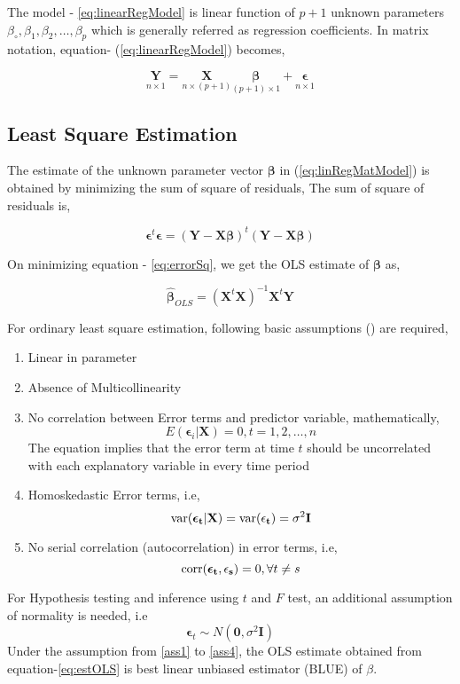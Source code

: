 \documentclass[12pt, lot, lof]{thesis}\usepackage[]{graphicx}\usepackage[]{color}
\newcommand{\bs}[1]{\ensuremath{\boldsymbol{#1}}}
\newcommand{\mbf}[1]{\ensuremath{\mathbf{#1}}}
\newcommand{\vl}[2]{\ensuremath{#1_1, #1_2, \ldots, #1_#2}}
\newcommand{\corr}[1]{\ifmmode \text{corr}(\mathbf{#1})\else corr($\mathbf{#1}$)\fi}
\newcommand{\var}[1]{\ifmmode \text{var}(\mathbf{#1})\else var($\mathbf{#1}$)\fi}
\begin{document}
The model - \ref{eq:linearRegModel} is linear function of $p+1$ unknown parameters $\beta_\circ, \vl{\beta}{p}$ which is generally referred as regression coefficients. In matrix notation, equation- (\ref{eq:linearRegModel}) becomes,

\begin{equation}
  \label{eq:linRegMatModel}
  \underset{n\times 1}{\mbf{Y}}=\underset{n\times(p+1)}{\mbf{X}}\underset{(p+1)\times 1}{\bs{\beta}}+\underset{n\times 1}{\bs{\epsilon}}
\end{equation}

\subsection{Least Square Estimation}
\label{ssec:lstSqEstimation}

The estimate of the unknown parameter vector $\bs{\beta}$ in (\ref{eq:linRegMatModel}) is obtained by minimizing the sum of square of residuals, 
The sum of square of residuals is,

\begin{equation}
  \bs{\epsilon}^{t}\bs{\epsilon}=(\mbf{Y-X}\bs{\beta})^{t}(\mbf{Y-X}\bs{\beta})
  \label{eq:errorSq}
\end{equation}

On minimizing equation - \ref{eq:errorSq}, we get the OLS estimate of $\bs{\beta}$ as,

\begin{equation}
  \hat{\bs{\beta}}_{OLS}=(\mbf{X}^{t}\mbf{X})^{-1}\mbf{X}^{t}\mbf{Y}
  \label{eq:estOLS}
\end{equation}

For ordinary least square estimation, following basic assumptions (\cite{wooldridge2012introductory}) are required,
\begin{enumerate}
\item Linear in parameter \label{ass1}
\item Absence of Multicollinearity \label{ass2}
\item No correlation between Error terms and predictor variable, mathematically,
\[
E(\mbf{\epsilon}_i|\mbf{X})=0, t=1,2,\ldots, n
\]
The equation implies that the error term at time $t$ should be uncorrelated with each explanatory variable in every time period
\item Homoskedastic Error terms, i.e, \label{ass3}
\[
\var{\bs{\epsilon}_t|\mbf{X}}=\var{\mbf{\epsilon}_t}=\sigma^2\mbf{I}
\]
\item No serial correlation (autocorrelation) in error terms, i.e, \label{ass4}
\[
\corr{\bs{\epsilon}_t, \mbf{\epsilon}_s}=0, \forall t\ne s
\]
\end{enumerate}
For Hypothesis testing and inference using $t$ and $F$ test, an additional assumption of normality is needed, i.e
\[
\mbf{\epsilon}_t\sim N(\mbf{0}, \sigma^2\mbf{I})
\]
Under the assumption from \ref{ass1} to \ref{ass4}, the OLS estimate obtained from equation-\ref{eq:estOLS} is best linear unbiased estimator (BLUE) of $\beta$.
\end{document}
